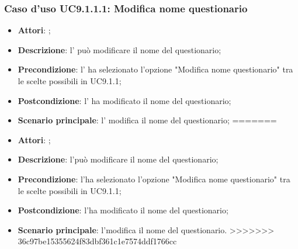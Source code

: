 					\subsubsection{Caso d'uso UC9.1.1.1: Modifica nome questionario}
					\label{UC9.1.1.1}
					\begin{itemize}
<<<<<<< HEAD
						\item \textbf{Attori}: \uaupro{};
						\item \textbf{Descrizione}: l'\uaupro{} può modificare il nome del questionario; 
						\item \textbf{Precondizione}: l'\uaupro{} ha selezionato l'opzione "Modifica nome questionario" tra le scelte possibili in UC9.1.1;
						\item \textbf{Postcondizione}: l'\uaupro{} ha modificato il nome del questionario; 
						\item \textbf{Scenario principale}: l'\uaupro{} modifica il nome del questionario;
=======
						\item \textbf{Attori}: \uaupro;
						\item \textbf{Descrizione}: l'\uaupro può modificare il nome del questionario; 
						\item \textbf{Precondizione}: l'\uaupro ha selezionato l'opzione "Modifica nome questionario" tra le scelte possibili in UC9.1.1;
						\item \textbf{Postcondizione}: l'\uaupro ha modificato il nome del questionario; 
						\item \textbf{Scenario principale}: l'\uaupro modifica il nome del questionario.
>>>>>>> 36c97be15355624f83dbf361c1e7574ddf1766cc
					\end{itemize}
																					
